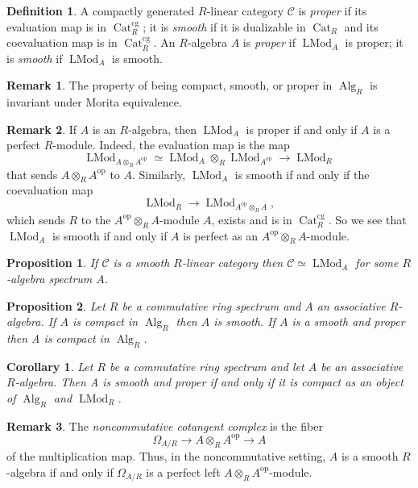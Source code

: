 \documentclass{article}
\newtheorem{corollary}{Corollary}[subsection]
\newtheorem{proposition}{Proposition}[subsection]
\theoremstyle{definition}
\newtheorem{definition}{Definition}[subsection]
\newtheorem{remark}{Remark}[subsection]
\newcommand{\C}{\mathcal{C}}
\newcommand{\too}{\longrightarrow}
\newcommand{\op}{\mathrm{op}}
\DeclareMathOperator{\LMod}{LMod}
\DeclareMathOperator{\Alg}{Alg}
\DeclareMathOperator{\Cat}{Cat}
\begin{document}
\begin{definition}
A compactly generated $R$-linear category $\C$ is {\em proper} if its evaluation map is in $\Cat_{R}^{\mathrm{cg}}$; it is {\em smooth} if it is dualizable in $\Cat_R$ and its  coevaluation map is in $\Cat_{R}^{\mathrm{cg}}$.
An $R$-algebra $A$ is {\em proper} if $\LMod_A$ is proper; it is {\em smooth} if $\LMod_A$ is smooth.
\end{definition}

\begin{remark}
The property of being compact, smooth, or proper in $\Alg_R$ is invariant under Morita equivalence.
\end{remark}
\begin{remark}
If $A$ is an $R$-algebra, then $\LMod_A$ is proper if and only if $A$ is a perfect
$R$-module. Indeed,  the evaluation map is the map
\begin{equation*}
\LMod_{A\otimes_R A^{\op}}\simeq\LMod_A\otimes_R\LMod_{A^{\op}}\longrightarrow\LMod_R
\end{equation*}
that sends $A\otimes_R A^{\op}$ to $A$.
Similarly,
$\LMod_A$ is smooth if and only if the coevaluation map
\[
\LMod_R\longrightarrow\LMod_{A^{\op}\otimes_R A},
\]
which sends $R$ to the
$A^{\op}\otimes_R A$-module $A$, exists and is in
$\Cat_{R}^{\mathrm{cg}}$. So we see that $\LMod_A$ is smooth if and only
if $A$ is perfect as an $A^{\op}\otimes_R A$-module.
\end{remark}
\begin{proposition}{\em \cite[Lemma 3.9]{AG14}}
If $\C$ is a smooth $R$-linear category then $\C\simeq\LMod_A$ for some $R$-algebra spectrum $A$.
\end{proposition}


\begin{proposition}{\em \cite[Proposition 7.3.5.8]{HA}}
Let $R$ be a commutative ring spectrum and $A$ an associative $R$-algebra.
If $A$ is compact in $\Alg_R$ then $A$ is smooth.
If $A$ is a smooth and proper then A is compact in $\Alg_R$.
\end{proposition}

\begin{corollary}{\em \cite[Corollary 7.3.5.9]{HA}}
Let $R$ be a commutative ring spectrum and let $A$ be an associative $R$-algebra.
Then A is smooth and proper if and only if it is compact as an object of $\Alg_R$ and $\LMod_R$.
\end{corollary}
\begin{remark}
The {\em noncommutative cotangent complex} is the fiber
\[
\Omega_{A/R}\too A\otimes_R A^{\op}\too A
\]
of the multiplication map.
Thus, in the noncommutative setting, $A$ is a smooth $R$-algebra if and only if $\Omega_{A/R}$ is a perfect left $A\otimes_R A^{\op}$-module.
\end{remark}
\end{document}
